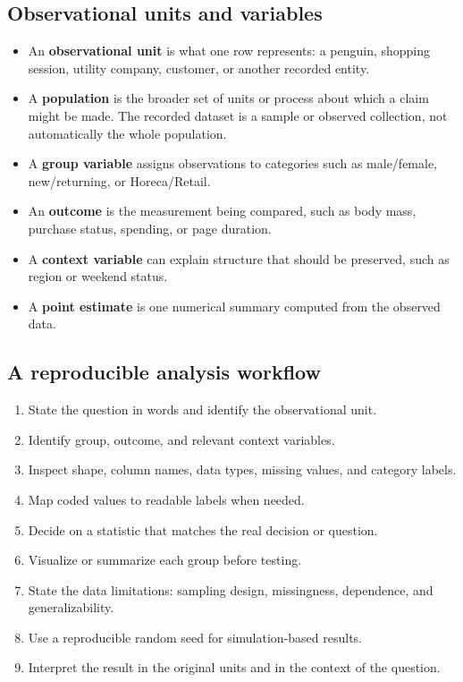 \documentclass[11pt]{article}
\begin{document}
\subsection{Observational units and variables}
\begin{itemize}
	\item An \textbf{observational unit} is what one row represents: a penguin, shopping session, utility company, customer, or another recorded entity.
	\item A \textbf{population} is the broader set of units or process about which a claim might be made. The recorded dataset is a sample or observed collection, not automatically the whole population.
	\item A \textbf{group variable} assigns observations to categories such as male/female, new/returning, or Horeca/Retail.
	\item An \textbf{outcome} is the measurement being compared, such as body mass, purchase status, spending, or page duration.
	\item A \textbf{context variable} can explain structure that should be preserved, such as region or weekend status.
	\item A \textbf{point estimate} is one numerical summary computed from the observed data.
\end{itemize}

\subsection{A reproducible analysis workflow}
\begin{enumerate}
	\item State the question in words and identify the observational unit.
	\item Identify group, outcome, and relevant context variables.
	\item Inspect shape, column names, data types, missing values, and category labels.
	\item Map coded values to readable labels when needed.
	\item Decide on a statistic that matches the real decision or question.
	\item Visualize or summarize each group before testing.
	\item State the data limitations: sampling design, missingness, dependence, and generalizability.
	\item Use a reproducible random seed for simulation-based results.
	\item Interpret the result in the original units and in the context of the question.
\end{enumerate}
\end{document}
